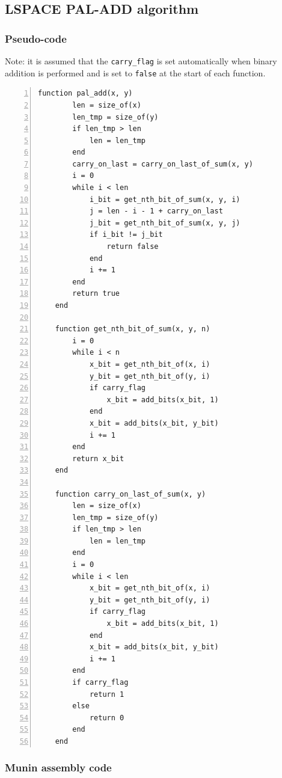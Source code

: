\documentclass[11pt, a4paper]{article}
\begin{document}


\subsection{LSPACE PAL-ADD algorithm}\label{app:palAdd}

\subsubsection{Pseudo-code}

Note: it is assumed that the \lstinline|carry_flag| is set automatically when binary addition is performed and is set to \lstinline|false| at the start of each function.

\begin{lstlisting}[numbers=left]
    function pal_add(x, y)
        len = size_of(x)
        len_tmp = size_of(y)
        if len_tmp > len
            len = len_tmp
        end
        carry_on_last = carry_on_last_of_sum(x, y)
        i = 0
        while i < len
            i_bit = get_nth_bit_of_sum(x, y, i)
            j = len - i - 1 + carry_on_last
            j_bit = get_nth_bit_of_sum(x, y, j)
            if i_bit != j_bit
                return false
            end
            i += 1
        end
        return true
    end

    function get_nth_bit_of_sum(x, y, n)
        i = 0
        while i < n
            x_bit = get_nth_bit_of(x, i)
            y_bit = get_nth_bit_of(y, i)
            if carry_flag
                x_bit = add_bits(x_bit, 1)
            end
            x_bit = add_bits(x_bit, y_bit)
            i += 1
        end
        return x_bit
    end

    function carry_on_last_of_sum(x, y)
        len = size_of(x)
        len_tmp = size_of(y)
        if len_tmp > len
            len = len_tmp
        end
        i = 0
        while i < len
            x_bit = get_nth_bit_of(x, i)
            y_bit = get_nth_bit_of(y, i)
            if carry_flag
                x_bit = add_bits(x_bit, 1)
            end
            x_bit = add_bits(x_bit, y_bit)
            i += 1
        end
        if carry_flag
            return 1
        else
            return 0
        end
    end
\end{lstlisting}

\subsubsection{Munin assembly code}
\end{document}
